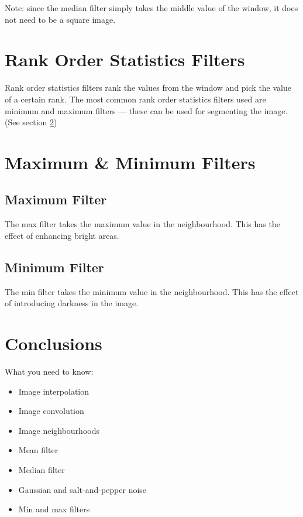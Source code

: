 \documentclass{article}
\begin{document}
Note: since the median filter simply takes the middle value of the window, it does not need to be a square image.

\section{Rank Order Statistics Filters}
Rank order statistics filters rank the values from the window and pick the value of a certain rank.
The most common rank order statistics filters used are minimum and maximum filters --- these can be used for segmenting the image. 
(See section \ref{maxmin})

\section{Maximum \& Minimum Filters} \label{maxmin}
\subsection{Maximum Filter}
The max filter takes the maximum value in the neighbourhood.
This has the effect of enhancing bright areas.

\subsection{Minimum Filter}
The min filter takes the minimum value in the neighbourhood.
This has the effect of introducing darkness in the image.

\section{Conclusions}
What you need to know:
\begin{itemize}
	\item Image interpolation
	\item Image convolution
	\item Image neighbourhoods
	\item Mean filter
	\item Median filter
	\item Gaussian and salt-and-pepper noise
	\item Min and max filters
\end{itemize}
\end{document}
